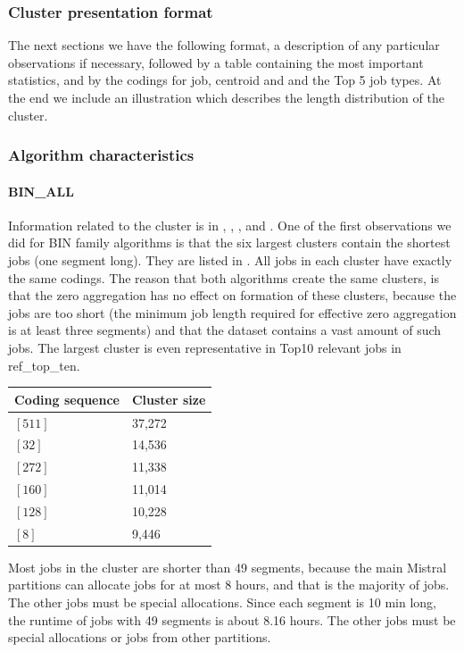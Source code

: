 \documentclass[]{llncs}
\begin{document}
\subsubsection{Cluster presentation format}
The next sections we have the following format, a description of any particular observations if necessary, followed by a table containing the most important statistics, and by the codings for job, centroid and and the Top 5 job types.
At the end we include an illustration which describes the length distribution of the cluster.
\subsubsection{Algorithm characteristics}
\paragraph{BIN\_ALL}
Information related to the cluster is in , , , and .
One of the first observations we did for BIN family algorithms is that the six largest clusters contain the shortest jobs (one segment long).
They are listed in .
All jobs in each cluster have exactly the same codings.
The reason that both algorithms create the same clusters, is that the zero aggregation has no effect on formation of these clusters, because the jobs are too short (the minimum job length required for effective zero aggregation is at least three segments) and that the dataset contains a vast amount of such jobs.
The largest cluster is even representative in Top10 relevant jobs in ref\_top\_ten.
\begingroup
  \centering
  \begin{tabular}{ll}
    Coding sequence & Cluster size \\
    \hline
    $[511]$ & 37,272 \\ 
    $[32]$  & 14,536 \\ 
    $[272]$ & 11,338 \\ 
    $[160]$ & 11,014 \\ 
    $[128]$ & 10,228 \\ 
    $[8]$   & 9,446  \\ 
  \end{tabular}
  \label{tab:bin:largest_clusters}
\endgroup
Most jobs in the cluster are shorter than 49 segments, because the main Mistral partitions can allocate jobs for at most 8 hours, and that is the majority of jobs.
The other jobs must be special allocations.
Since each segment is 10 min long, the runtime of jobs with 49 segments is about 8.16 hours.
The other jobs must be special allocations or jobs from other partitions.
\end{document}
